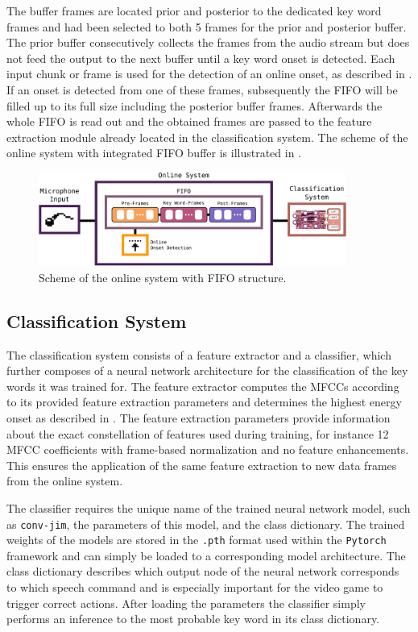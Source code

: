 The buffer frames are located prior and posterior to the dedicated key word frames and had been selected to both 5 frames for the prior and posterior buffer.
The prior buffer consecutively collects the frames from the audio stream but does not feed the output to the next buffer until a key word onset is detected. 
Each input chunk or frame is used for the detection of an online onset, as described in .
If an onset is detected from one of these frames, subsequently the FIFO will be filled up to its full size including the posterior buffer frames.
Afterwards the whole FIFO is read out and the obtained frames are passed to the feature extraction module already located in the classification system.
The scheme of the online system with integrated FIFO buffer is illustrated in .
\begin{figure}[!ht]
  \centering
  \includegraphics[width=0.9\textwidth]{./6_game/figs/game_system_online.pdf}
  \caption{Scheme of the online system with FIFO structure.}
  \label{fig:game_system_online}
\end{figure}
\FloatBarrier
\noindent



\subsection{Classification System}
The classification system consists of a feature extractor and a classifier, which further composes of a neural network architecture for the classification of the key words it was trained for.
The feature extractor computes the MFCCs according to its provided feature extraction parameters and determines the highest energy onset as described in .
The feature extraction parameters provide information about the exact constellation of features used during training, for instance 12 MFCC coefficients with frame-based normalization and no feature enhancements.
This ensures the application of the same feature extraction to new data frames from the online system.

The classifier requires the unique name of the trained neural network model, such as \texttt{conv-jim}, the parameters of this model, and the class dictionary.
The trained weights of the  models are stored in the \texttt{.pth} format used within the \texttt{Pytorch} framework and can simply be loaded to a corresponding model architecture.
The class dictionary describes which output node of the neural network corresponds to which speech command and is especially important for the video game to trigger correct actions.
After loading the parameters the classifier simply performs an inference to the most probable key word in its class dictionary.

